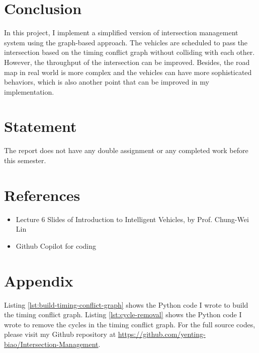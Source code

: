 \documentclass{article}
\begin{document}
\begin{multicols*}{2}
    

    \section{Conclusion}
    In this project, I implement a simplified version of intersection management system using the graph-based approach. The vehicles are scheduled to pass the intersection based on the timing conflict graph without colliding with each other. However, the throughput of the intersection can be improved. Besides, the road map in real world is more complex and the vehicles can have more sophisticated behaviors, which is also another point that can be improved in my implementation.

    \section*{Statement}
    The report does not have any double assignment or any completed work before this semester.

    \section*{References}
    \begin{itemize}[itemsep=0pt, leftmargin=*]
        \item Lecture 6 Slides of Introduction to Intelligent Vehicles, by Prof. Chung-Wei Lin
        \item Github Copilot for coding
    \end{itemize}
\end{multicols*}

\newpage
\section*{Appendix}
Listing \ref{lst:build-timing-conflict-graph} shows the Python code I wrote to build the timing conflict graph. Listing \ref{lst:cycle-removal} shows the Python code I wrote to remove the cycles in the timing conflict graph. For the full source codes, please visit my Github repository at \url{https://github.com/yenting-biao/Intersection-Management}.
\end{document}
